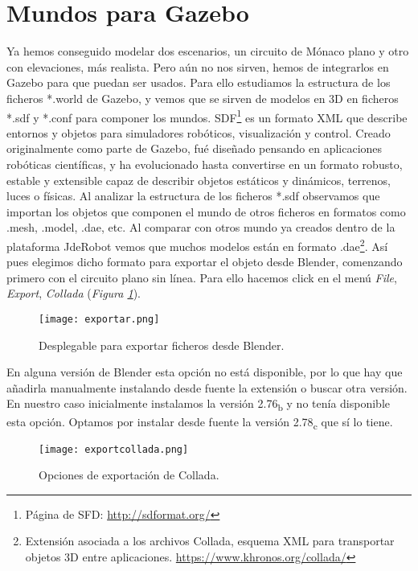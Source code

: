 \section{Mundos para Gazebo}
\label{sec:circarr_mundosparagazebo}

Ya hemos conseguido modelar dos escenarios, un circuito de Mónaco plano y otro con elevaciones, más realista. Pero aún no nos sirven, hemos de integrarlos en Gazebo para que puedan ser usados. Para ello estudiamos la estructura de los ficheros *.world de Gazebo, y vemos que se sirven de modelos en 3D en ficheros *.sdf y *.conf para componer los mundos. SDF\footnote{Página de SFD: \url{http://sdformat.org/}} es un formato XML que describe entornos y objetos para simuladores robóticos, visualización y control. Creado originalmente como parte de Gazebo, fué diseñado pensando en aplicaciones robóticas científicas, y ha evolucionado hasta convertirse en un formato robusto, estable y extensible capaz de describir objetos estáticos y dinámicos, terrenos, luces o físicas. 
Al analizar la estructura de los ficheros *.sdf observamos que importan los objetos que componen el mundo de otros ficheros en formatos como .mesh, .model, .dae, etc. Al comparar con otros mundo ya creados dentro de la plataforma JdeRobot vemos que muchos modelos están en formato .dae\footnote{Extensión asociada a los archivos Collada, esquema XML para transportar objetos 3D entre aplicaciones. \url{https://www.khronos.org/collada/}}. Así pues elegimos dicho formato para exportar el objeto desde Blender, comenzando primero con el circuito plano sin línea. Para ello hacemos click en el menú \textit{File}, \textit{Export}, \textit{Collada} (\textit{Figura \ref{fig:exportar}}).

\begin{figure}[h]
	\centering
	\texttt{[image: exportar.png]}
	\caption{Desplegable para exportar ficheros desde Blender.} \label{fig:exportar}
\end{figure}

En alguna versión de Blender esta opción no está disponible, por lo que hay que añadirla manualmente instalando desde fuente la extensión o buscar otra versión. En nuestro caso inicialmente instalamos la versión 2.76\textsubscript{b} y no tenía disponible esta opción. Optamos por instalar desde fuente la versión 2.78\textsubscript{c} que sí lo tiene. 

\begin{figure}[t]
	\centering
	\texttt{[image: exportcollada.png]}
	\caption{Opciones de exportación de Collada.} \label{fig:exportcollada}
\end{figure}

